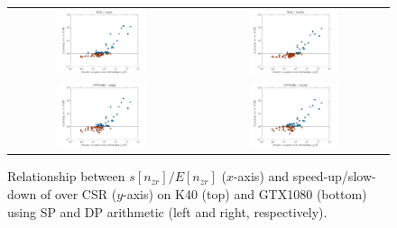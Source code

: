 \begin{figure}[t]
\begin{tabular}{cc}
\includegraphics[width=0.48\textwidth]{plots/std_speedup_K40_single.pdf} &
\includegraphics[width=0.48\textwidth]{plots/std_speedup_K40_double.pdf}\\
\includegraphics[width=0.48\textwidth]{plots/std_speedup_GTX1080_single.pdf} &
\includegraphics[width=0.48\textwidth]{plots/std_speedup_GTX1080_double.pdf}
\end{tabular}
\vspace*{-2ex}
\caption{Relationship between $s[n_{zr}]/E[n_{zr}]$ ($x$-axis)
    and speed-up/slow-down of \bcsr over CSR ($y$-axis)
    on K40 (top) and GTX1080 (bottom)
    using SP and DP arithmetic (left and right, respectively).}
\label{2017-csr-spmv:fig:deviation}
\end{figure}

